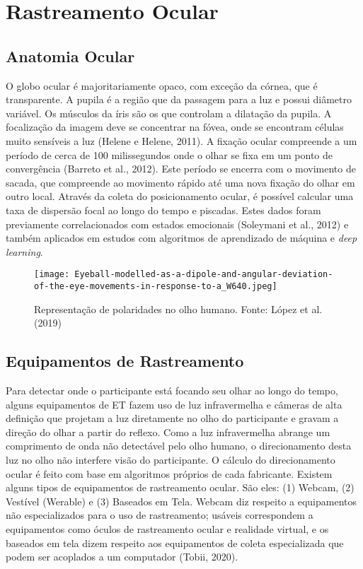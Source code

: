 \chapter{Rastreamento Ocular}

\section{Anatomia Ocular}
O globo ocular é majoritariamente opaco, com exceção da córnea, que é transparente. 
A pupila é a região que da passagem para a luz e possui diâmetro variável. Os músculos da íris são os que controlam a dilatação da pupila. 
A focalização da imagem deve se concentrar na fóvea, onde se encontram células muito sensíveis a luz (Helene e Helene, 2011). 
A fixação ocular compreende a um período de cerca de 100 milissegundos onde o olhar se fixa em um ponto de convergência (Barreto et al., 2012). 
Este período se encerra com o movimento de sacada, que compreende ao movimento rápido até uma nova fixação do olhar em outro local.
Através da coleta do posicionamento ocular, é possível calcular uma taxa de dispersão focal ao longo do tempo e piscadas. 
Estes dados foram previamente correlacionados com estados emocionais (Soleymani et al., 2012) e 
também aplicados em estudos com algoritmos de aprendizado de máquina e \textit{deep learning}. 

\begin{figure}[h]
    \centering
    \texttt{[image: Eyeball-modelled-as-a-dipole-and-angular-deviation-of-the-eye-movements-in-response-to-a\_W640.jpeg]}
    \caption[]{Representação de polaridades no olho humano. Fonte:  López et al. (2019)}\label{fig:}
    \end{figure}

\section{Equipamentos de Rastreamento}
Para detectar onde o participante está focando seu olhar ao longo do tempo, alguns equipamentos de ET
 fazem uso de luz infravermelha e câmeras de alta definição que projetam a luz
  diretamente no olho do participante e gravam a direção do olhar a partir do reflexo. 
  Como a luz infravermelha abrange um comprimento de onda não detectável pelo olho humano, 
  o direcionamento desta luz no olho não interfere visão do participante. 
  O cálculo do direcionamento ocular é feito com base em algoritmos próprios de cada fabricante. 
  Existem alguns tipos de equipamentos de rastreamento ocular. São eles: (1) Webcam, (2) Vestível (Werable) e (3) Baseados em Tela. 
  Webcam diz respeito a equipamentos não especializados para o uso de rastreamento; usáveis correspondem a equipamentos como óculos de rastreamento ocular 
  e realidade virtual, e os baseados em tela dizem respeito aos equipamentos de coleta especializada que podem 
  ser acoplados a um computador (Tobii, 2020).


